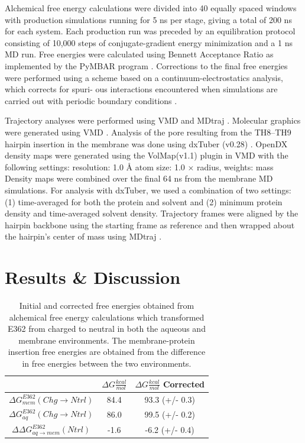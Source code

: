 Alchemical free energy calculations were divided into 40 equally spaced windows with production simulations running for 5 ns per stage, giving a total of 200 ns for each system.
Each production run was preceded by an equilibration protocol consisting of 10,000 steps of conjugate-gradient energy minimization and a 1 ns MD run. 
Free energies were calculated using Bennett Acceptance Ratio \cite{bennett1976efficient} as implemented by the PyMBAR program \cite{shirts2008statistically, chodera2007use}.
Corrections to the final free energies were performed using a scheme based on a continuum-electrostatics analysis, which corrects for spuri- ous interactions encountered when simulations are carried out with periodic boundary conditions \cite{rocklin2013calculating}.

Trajectory analyses were performed using VMD and MDtraj \cite{mcgibbon2015mdtraj}.
Molecular graphics were generated using VMD \cite{humphrey1996vmd}.
Analysis of the pore resulting from the TH8–TH9 hairpin insertion in the membrane was done using dxTuber (v0.28) \cite{raunest2011dxtuber}.
OpenDX density maps were generated using the VolMap(v1.1) plugin in VMD with the following settings: resolution: 1.0 Å atom size: 1.0 × radius, weights: mass
Density maps were combined over the final 64 ns from the membrane MD simulations.
For analysis with dxTuber, we used a combination of two settings: (1) time-averaged for both the protein and solvent and (2) minimum protein density and time-averaged solvent density. Trajectory frames were aligned by the hairpin backbone using the starting frame as reference and then wrapped about the hairpin’s center of mass using MDtraj \cite{mcgibbon2015mdtraj}.

\section{Results \& Discussion}

\begin{table}[H]
\centering
\caption{Initial and corrected\cite{rocklin2013calculating} free energies obtained from alchemical free energy calculations which transformed E362 from charged to neutral in both the aqueous and membrane environments. The membrane-protein insertion free energies are obtained from the difference in free energies between the two environments.}
\label{tbl:dtt_ddG}
\begin{tabular}{|c|c|c|}
\hline
& \boldmath$\Delta G\frac{kcal}{mol}$   & \boldmath$\Delta G\frac{kcal}{mol}$ Corrected     \\ \hline
$\Delta G_{mem}^{E362}(Chg\rightarrow Ntrl)$ & 84.4 & 93.3 (+/- 0.3) \\ \hline
$\Delta G_{aq}^{E362}(Chg\rightarrow Ntrl)$  & 86.0 & 99.5 (+/- 0.2) \\ \hline
$\Delta\Delta G_{aq\rightarrow mem}^{E362}(Ntrl)$ & -1.6 & -6.2 (+/- 0.4) \\ \hline
\end{tabular}
\end{table}

